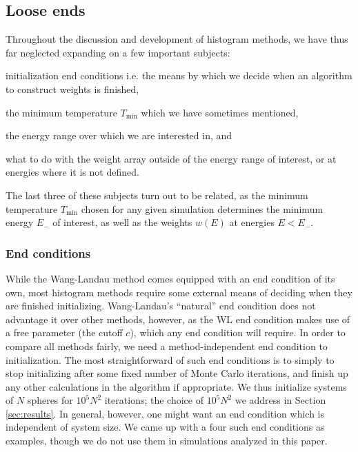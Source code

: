 \documentclass[11pt]{article}
\renewcommand{\t}{\text} %
\newcommand{\p}[1]{\left(#1\right)} %
\begin{document}
\subsection{Loose ends}
\label{sec:loose_ends}

Throughout the discussion and development of histogram methods, we
have thus far neglected expanding on a few important subjects:
\begin{enumerate*}[label=\roman*)]
\item initialization end conditions i.e. the means by which we decide
  when an algorithm to construct weights is finished,
\item the minimum temperature $T_{\t{min}}$ which we have sometimes
  mentioned,
\item the energy range over which we are interested in, and
\item what to do with the weight array outside of the energy range of
  interest, or at energies where it is not defined.
\end{enumerate*}
The last three of these subjects turn out to be related, as the
minimum temperature $T_{\t{min}}$ chosen for any given simulation
determines the minimum energy $E_-$ of interest, as well as the
weights $w\p{E}$ at energies $E<E_-$.

\subsubsection{End conditions}
\label{sec:end_conditions}

While the Wang-Landau method comes equipped with an end condition of
its own, most histogram methods require some external means of
deciding when they are finished initializing. Wang-Landau's
``natural'' end condition does not advantage it over other methods,
however, as the WL end condition makes use of a free parameter (the
cutoff $c$), which any end condition will require. In order to compare
all methods fairly, we need a method-independent end condition to
initialization. The most straightforward of such end conditions is to
simply to stop initializing after some fixed number of Monte Carlo
iterations, and finish up any other calculations in the algorithm if
appropriate. We thus initialize systems of $N$ spheres for $10^5N^2$
iterations; the choice of $10^5N^2$ we address in Section
\ref{sec:results}. In general, however, one might want an end
condition which is independent of system size. We came up with a four
such end conditions as examples, though we do not use them in
simulations analyzed in this paper.
\end{document}
